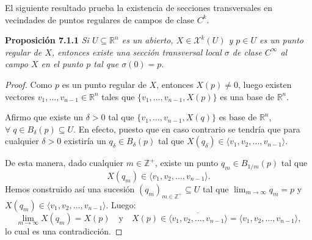 \documentclass[11pt,a4paper]{article}
\theoremstyle{definition}
\theoremstyle{plain}
\theoremstyle{remark}
\begin{document}
	El siguiente resultado prueba la existencia de secciones transversales en vecindades de puntos regulares de campos de clase $C^k$.
	
	\noindent \textbf{Proposición 7.1.1} \textit{Si $U \subseteq \mathbb{R}^n$ es un abierto, $X \in \mathcal{X}^k(U)$ y $p \in U$ es un punto regular de $X$, entonces existe una sección transversal local $\sigma$ de clase $C^\infty$ al campo $X$ en el punto $p$ tal que $\sigma(0) = p$.}
	
	\begin{proof}
		Como $p$ es un punto regular de $X$, entonces $X(p) \neq 0$, luego existen vectores $v_1, \dots, v_{n-1} \in \mathbb{R}^n$ tales que $\{v_1, \dots, v_{n-1}, X(p)\}$ es una base de $\mathbb{R}^n$.
		
		Afirmo que existe un $\delta > 0$ tal que $\{v_1, \dots, v_{n-1}, X(q)\}$ es base de $\mathbb{R}^n$, $\forall \; q \in B_\delta(p) \subseteq U$. En efecto, puesto que en caso contrario se tendría que para cualquier $\delta > 0$ existiría un $q_\delta \in B_\delta(p)$ tal que $X(q_\delta) \in \langle v_1, v_2, \dots, v_{n-1} \rangle$.
		
		De esta manera, dado cualquier $m \in \mathbb{Z}^+$, existe un punto $q_m \in B_{1/m}(p)$ tal que
		\[
		X(q_m) \in \langle v_1, v_2, \dots, v_{n-1} \rangle.
		\]
		Hemos construido así una sucesión $(q_m)_{m \in \mathbb{Z}^+} \subseteq U$ tal que $\lim_{m \to \infty} q_m = p$ y $X(q_m) \in \langle v_1, v_2, \dots, v_{n-1} \rangle$. Luego:
		\[
		\lim_{m \to \infty} X(q_m) = X(p) \quad \text{y} \quad X(p) \in \overline{\langle v_1, v_2, \dots, v_{n-1} \rangle} = \langle v_1, v_2, \dots, v_{n-1} \rangle,
		\]
		lo cual es una contradicción.
		

\end{proof}
\end{document}
